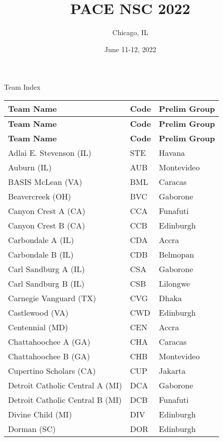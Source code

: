\documentclass{article}%
\title{PACE NSC 2022}%
\author{Chicago, IL}%
\date{June 11{-}12, 2022}%
\begin{document}
%
\normalsize%
%
\maketitle%
\vspace*{48pt}%
\begin{center}%
\begin{Huge}%
Team Index%
\end{Huge}%
\end{center}%
\newpage%
%
%
\begin{longtable}{|ll|l|}%
\rowcolor{gray!30}%
\hline%
\textbf{Team Name} & \textbf{Code}&\textbf{Prelim Group}\\%
\hline%
\endhead%
\hline%
\rowcolor{gray!25}%
\textbf{Team Name} & \textbf{Code}&\textbf{Prelim Group}\\%
\hline%
\endfoot%
\hline%
\hline\rowcolor{gray!25}%
\textbf{Team Name} & \textbf{Code}&\textbf{Prelim Group}\\%
\hline%
\endlastfoot%
\hline%
Adlai E. Stevenson (IL)&STE&Havana\\%
Auburn (IL)&AUB&Montevideo\\%
BASIS McLean (VA)&BML&Caracas\\%
Beavercreek (OH)&BVC&Gaborone\\%
Canyon Crest A (CA)&CCA&Funafuti\\%
Canyon Crest B (CA)&CCB&Edinburgh\\%
Carbondale A (IL)&CDA&Accra\\%
Carbondale B (IL)&CDB&Belmopan\\%
Carl Sandburg A (IL)&CSA&Gaborone\\%
Carl Sandburg B (IL)&CSB&Lilongwe\\%
Carnegie Vanguard (TX)&CVG&Dhaka\\%
Castlewood (VA)&CWD&Edinburgh\\%
Centennial (MD)&CEN&Accra\\%
Chattahoochee A (GA)&CHA&Caracas\\%
Chattahoochee B (GA)&CHB&Montevideo\\%
Cupertino Scholars (CA)&CUP&Jakarta\\%
Detroit Catholic Central A (MI)&DCA&Gaborone\\%
Detroit Catholic Central B (MI)&DCB&Funafuti\\%
Divine Child (MI)&DIV&Edinburgh\\%
Dorman (SC)&DOR&Edinburgh\\%

\end{longtable}
\end{document}
